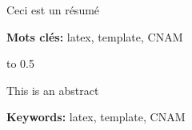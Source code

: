 \documentclass[12pt]{article}
\begin{document}
Ceci est un résumé

\textbf{Mots clés:} latex, template, CNAM\\

\centerline{\hbox to 0.5\textwidth{\hrulefill}}

\begin{center}


\end{center}

This is an abstract

\textbf{Keywords:} latex, template, CNAM
\end{document}
